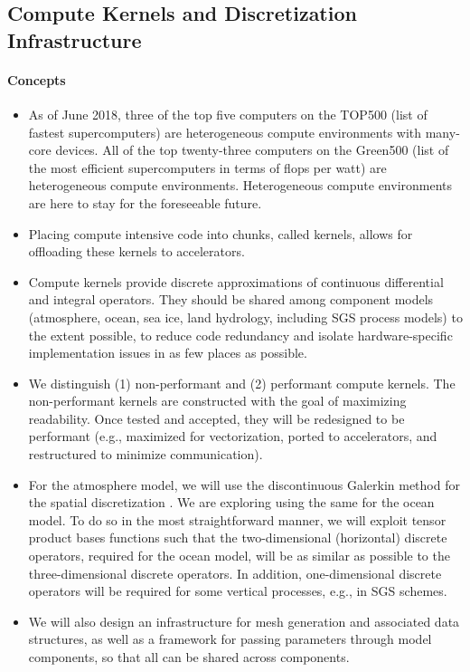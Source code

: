 \documentclass{article}
\begin{document}
\subsection{Compute Kernels and Discretization Infrastructure}

\paragraph{Concepts}
\begin{itemize}
    \item As of June 2018, three of the top five computers on the TOP500 (list of fastest supercomputers) are heterogeneous compute environments with many-core devices.  All of the top twenty-three computers on the Green500 (list of the most efficient supercomputers in terms of flops per watt) are heterogeneous compute environments.  Heterogeneous compute environments are here to stay for the foreseeable future.
    \item Placing compute intensive code into chunks, called kernels, allows for offloading these kernels to accelerators.
    \item Compute kernels provide discrete approximations of continuous differential and integral operators. They should be shared among component models (atmosphere, ocean, sea ice, land hydrology, including SGS process models) to the extent possible, to reduce code redundancy and isolate hardware-specific implementation issues in as few places as possible. 
    \item We distinguish (1) non-performant and (2) performant compute kernels. The non-performant kernels are constructed with the goal of maximizing readability.  Once tested and accepted, they will be redesigned to be performant (e.g., maximized for vectorization, ported to accelerators, and restructured to minimize communication).
    \item For the atmosphere model, we will use the discontinuous Galerkin method for the spatial discretization \citep{abdi:2016}. We are exploring using the same for the ocean model.  To do so in the most straightforward manner, we will exploit tensor product bases functions such that the two-dimensional (horizontal) discrete operators, required for the ocean model, will be as similar as possible to the three-dimensional discrete operators. In addition, one-dimensional discrete operators will be required for some vertical processes, e.g., in SGS schemes.
    \item We will also design an infrastructure for mesh generation and associated data structures, as well as a framework for passing parameters through model components, so that all can be shared across components.
\end{itemize}
\end{document}
